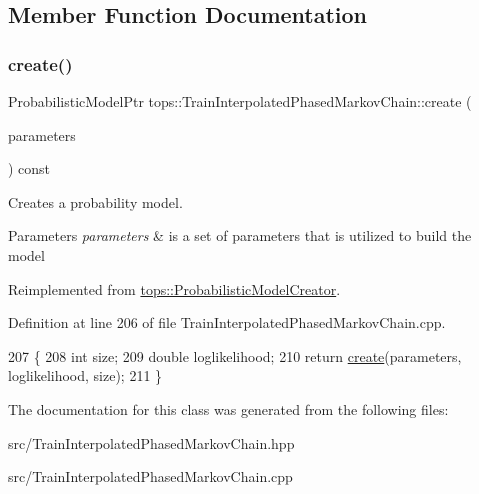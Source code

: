 \subsection{Member Function Documentation}
\mbox{\label{classtops_1_1TrainInterpolatedPhasedMarkovChain_a218b211bb755e02ffd30e8420d52d949}} 
\subsubsection{\texorpdfstring{create()}{create()}}
{\footnotesize\ttfamily Probabilistic\+Model\+Ptr tops\+::\+Train\+Interpolated\+Phased\+Markov\+Chain\+::create (\begin{DoxyParamCaption}\item[{\hyperlink{classtops_1_1ProbabilisticModelParameters}{Probabilistic\+Model\+Parameters} \&}]{parameters }\end{DoxyParamCaption}) const\hspace{0.3cm}{\ttfamily [virtual]}}



Creates a probability model. 


\begin{DoxyParams}{Parameters}
{\em parameters} & is a set of parameters that is utilized to build the model \\
\hline
\end{DoxyParams}


Reimplemented from \hyperlink{classtops_1_1ProbabilisticModelCreator_afed6c8ffa45fff446bdaa8b533da8f7c}{tops\+::\+Probabilistic\+Model\+Creator}.



Definition at line 206 of file Train\+Interpolated\+Phased\+Markov\+Chain.\+cpp.


\begin{DoxyCode}
207                                                                                                            
                 \{
208         \textcolor{keywordtype}{int} size;
209         \textcolor{keywordtype}{double} loglikelihood;
210         \textcolor{keywordflow}{return} \hyperlink{classtops_1_1TrainInterpolatedPhasedMarkovChain_a218b211bb755e02ffd30e8420d52d949}{create}(parameters, loglikelihood, size);
211     \}
\end{DoxyCode}


The documentation for this class was generated from the following files\+:\begin{DoxyCompactItemize}
\item 
src/Train\+Interpolated\+Phased\+Markov\+Chain.\+hpp\item 
src/Train\+Interpolated\+Phased\+Markov\+Chain.\+cpp\end{DoxyCompactItemize}
